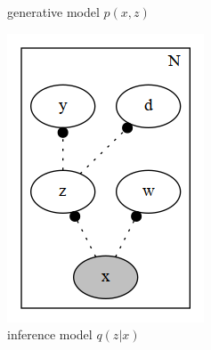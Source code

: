 \documentclass[final]{beamer}
\theoremstyle{plain}
\theoremstyle{definition}
\theoremstyle{remark}
\begin{document}
\begin{frame}
\begin{figure}[h]
\begin{subfigure}[b]{0.2\textwidth}
\caption{generative model $p(x,z)$}
\end{subfigure}
\begin{subfigure}[b]{0.2\textwidth}
\includegraphics[width=\textwidth]{plots/dirichlet_gmm_q.gv.png}
\caption{inference model $q(z|x)$}
\end{subfigure}
\begin{subfigure}[b]{0.4\textwidth}

\end{subfigure}
\end{figure}
\end{frame}
\end{document}

